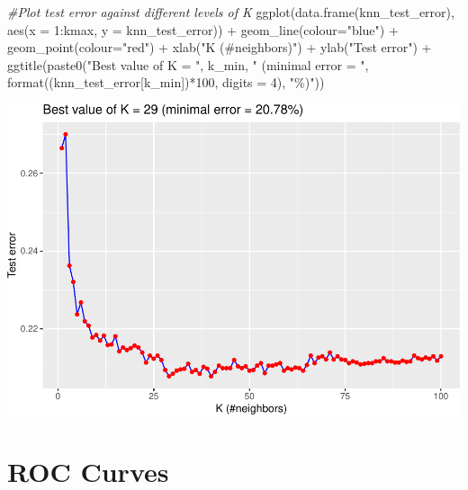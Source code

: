 \documentclass[
]{article}
\newenvironment{Shaded}{\begin{snugshade}}{\end{snugshade}}
\newcommand{\AttributeTok}[1]{\textcolor[rgb]{0.77,0.63,0.00}{#1}}
\newcommand{\CommentTok}[1]{\textcolor[rgb]{0.56,0.35,0.01}{\textit{#1}}}
\newcommand{\DecValTok}[1]{\textcolor[rgb]{0.00,0.00,0.81}{#1}}
\newcommand{\FunctionTok}[1]{\textcolor[rgb]{0.00,0.00,0.00}{#1}}
\newcommand{\NormalTok}[1]{#1}
\newcommand{\SpecialCharTok}[1]{\textcolor[rgb]{0.00,0.00,0.00}{#1}}
\newcommand{\StringTok}[1]{\textcolor[rgb]{0.31,0.60,0.02}{#1}}
\begin{document}
\begin{Shaded}
\begin{Highlighting}[]
\CommentTok{\#Plot test error against different levels of K}
\FunctionTok{ggplot}\NormalTok{(}\FunctionTok{data.frame}\NormalTok{(knn\_test\_error), }
      \FunctionTok{aes}\NormalTok{(}\AttributeTok{x =} \DecValTok{1}\SpecialCharTok{:}\NormalTok{kmax, }\AttributeTok{y =}\NormalTok{ knn\_test\_error)) }\SpecialCharTok{+}
      \FunctionTok{geom\_line}\NormalTok{(}\AttributeTok{colour=}\StringTok{"blue"}\NormalTok{) }\SpecialCharTok{+}
      \FunctionTok{geom\_point}\NormalTok{(}\AttributeTok{colour=}\StringTok{"red"}\NormalTok{) }\SpecialCharTok{+}
      \FunctionTok{xlab}\NormalTok{(}\StringTok{"K (\#neighbors)"}\NormalTok{) }\SpecialCharTok{+} 
      \FunctionTok{ylab}\NormalTok{(}\StringTok{"Test error"}\NormalTok{) }\SpecialCharTok{+}
      \FunctionTok{ggtitle}\NormalTok{(}\FunctionTok{paste0}\NormalTok{(}\StringTok{"Best value of K = "}\NormalTok{, k\_min,}
                     \StringTok{" (minimal error = "}\NormalTok{,}
                    \FunctionTok{format}\NormalTok{((knn\_test\_error[k\_min])}\SpecialCharTok{*}\DecValTok{100}\NormalTok{, }\AttributeTok{digits =} \DecValTok{4}\NormalTok{), }
                    \StringTok{"\%)"}\NormalTok{))}
\end{Highlighting}
\end{Shaded}

\includegraphics{Rain_Australia_files/figure-latex/plot error-1.pdf}

\hypertarget{roc-curves}{%
\section{ROC Curves}\label{roc-curves}}
\end{document}

